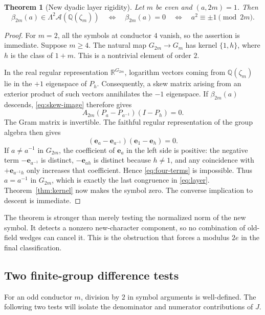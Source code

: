 \documentclass[11pt]{article}
\numberwithin{equation}{section}
\newtheorem{theorem}{Theorem}[section]
\theoremstyle{definition}
\theoremstyle{remark}
\newcommand{\Q}{\mathbb Q}
\newcommand{\R}{\mathbb R}
\newcommand{\A}{\mathcal A}
\newcommand{\ee}{\mathbf e}
\newcommand{\inv}{^{-1}}
\begin{document}
\begin{theorem}[New dyadic layer rigidity]\label{thm:layer}
Let $m$ be even and $(a,2m)=1$. Then
\begin{equation}\label{eq:layer}
 \beta_{2m}(a)\in\Lambda^2\A(\Q(\zeta_m))
 \quad\Longleftrightarrow\quad
 \beta_{2m}(a)=0
 \quad\Longleftrightarrow\quad
 a^2\equiv\pm1\pmod{2m}.
\end{equation}
\end{theorem}
\begin{proof}
For $m=2$, all the symbols at conductor $4$ vanish, so the assertion
is immediate. Suppose $m\ge4$. The natural map
$G_{2m}\to G_m$ has kernel $\{1,h\}$, where $h$ is the class of
$1+m$. This is a nontrivial element of order $2$.

In the real regular representation $\R^{G_{2m}}$, logarithm vectors
coming from $\Q(\zeta_m)$ lie in the $+1$ eigenspace of $P_h$.
Consequently, a skew matrix arising from an exterior product of such
vectors annihilates the $-1$ eigenspace. If $\beta_{2m}(a)$ descends,
\eqref{eq:skew-image} therefore gives
\[
 A_{2m}(P_a-P_{a\inv})(I-P_h)=0.
\]
The Gram matrix is invertible. The faithful regular representation of
the group algebra then gives
\begin{equation}\label{eq:four-terms}
 (\ee_a-\ee_{a\inv})(\ee_1-\ee_h)=0.
\end{equation}
If $a\ne a\inv$ in $G_{2m}$, the coefficient of $\ee_a$ in the left
side is positive: the negative term $-\ee_{a\inv}$ is distinct,
$-\ee_{ah}$ is distinct because $h\ne1$, and any coincidence with
$+\ee_{a\inv h}$ only increases that coefficient. Hence
\eqref{eq:four-terms} is impossible. Thus $a=a\inv$ in $G_{2m}$,
which is exactly the last congruence in \eqref{eq:layer}.
Theorem~\ref{thm:kernel} now makes the symbol zero. The converse
implication to descent is immediate.
\end{proof}

The theorem is stronger than merely testing the normalized norm of the
new symbol. It detects a nonzero new-character component, so no
combination of old-field wedges can cancel it. This is the obstruction
that forces a modulus $2e$ in the final classification.

\subsection{Two finite-group difference tests}

For an odd conductor $m$, division by $2$ in symbol arguments is
well-defined. The following two tests will isolate the denominator and
numerator contributions of $J$.
\end{document}
